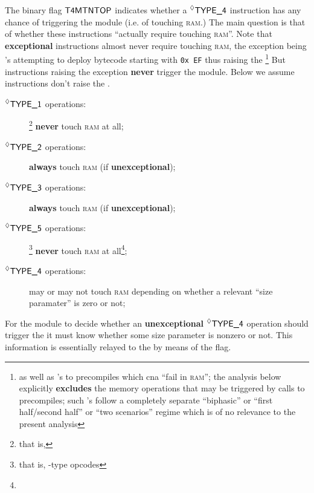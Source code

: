 The binary flag $\textsf{T4MTNTOP}$ indicates whether a $\prescript{\lozenge}{}{\textsf{TYPE\_4}}$ instruction has any chance of triggering the \mmuMod{} module (i.e. of touching \textsc{ram}.)
The main question is that of whether these instructions ``actually require touching \textsc{ram}''.
Note that \textbf{exceptional} instructions almost never require touching \textsc{ram}, the exception being 's attempting to deploy bytecode starting with \texttt{0x\,EF} thus raising the \icpxSH{}\footnote{as well as 's to precompiles which cna ``fail in \textsc{ram}''; the analysis below explicitly \textbf{excludes} the memory operations that may be triggered by calls to precompiles; such 's follow a completely separate ``biphasic'' or ``first half/second half'' or ``two scenarios'' regime which is of no relevance to the present analysis}
But instructions raising the \mxpxSH{} exception \textbf{never} trigger the \mmuMod{} module.
Below we assume instructions don't raise the \mxpxSH{}.
\begin{description}
    \item[$\prescript{\lozenge}{}{\textsf{TYPE\_1}}$ operations:]\footnote{that is, }
        \textbf{never} touch \textsc{ram} at all;
    \item[$\prescript{\lozenge}{}{\textsf{TYPE\_2}}$ operations:]
        \textbf{always} touch \textsc{ram} (if \textbf{unexceptional});
    \item[$\prescript{\lozenge}{}{\textsf{TYPE\_3}}$ operations:]
        \textbf{always} touch \textsc{ram} (if \textbf{unexceptional});
    \item[$\prescript{\lozenge}{}{\textsf{TYPE\_5}}$ operations:]\footnote{that is, -type opcodes}
        \textbf{never} touch \textsc{ram} at all\footnote{};
    \item[$\prescript{\lozenge}{}{\textsf{TYPE\_4}}$ operations:] may or may not touch \textsc{ram} depending on whether a relevant ``size paramater'' is zero or not;
\end{description}
For the \hubMod{} module to decide whether an \textbf{unexceptional} $\prescript{\lozenge}{}{\textsf{TYPE\_4}}$ operation should trigger the \mmuMod{} it must know whether some size parameter is nonzero or not.
This information is essentially relayed to the \hubMod{} by means of the \mayTriggerNonTrivialOperation{} flag.

